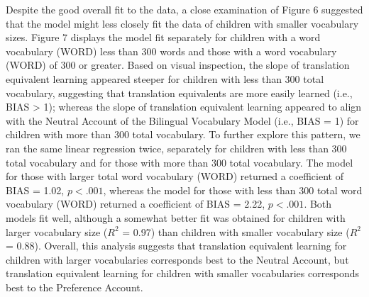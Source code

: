 \documentclass[
  english,
  ,man,floatsintext]{apa6}
\begin{document}
Despite the good overall fit to the data, a close examination of Figure 6 suggested that the model might less closely fit the data of children with smaller vocabulary sizes. Figure 7 displays the model fit separately for children with a word vocabulary (WORD) less than 300 words and those with a word vocabulary (WORD) of 300 or greater. Based on visual inspection, the slope of translation equivalent learning appeared steeper for children with less than 300 total vocabulary, suggesting that translation equivalents are more easily learned (i.e., BIAS \textgreater{} 1); whereas the slope of translation equivalent learning appeared to align with the Neutral Account of the Bilingual Vocabulary Model (i.e., BIAS = 1) for children with more than 300 total vocabulary. To further explore this pattern, we ran the same linear regression twice, separately for children with less than 300 total vocabulary and for those with more than 300 total vocabulary. The model for those with larger total word vocabulary (WORD) returned a coefficient of BIAS = 1.02, \(p < .001\), whereas the model for those with less than 300 total word vocabulary (WORD) returned a coefficient of BIAS = 2.22, \(p < .001\). Both models fit well, although a somewhat better fit was obtained for children with larger vocabulary size (\(R^2\) = 0.97) than children with smaller vocabulary size (\(R^2\) = 0.88). Overall, this analysis suggests that translation equivalent learning for children with larger vocabularies corresponds best to the Neutral Account, but translation equivalent learning for children with smaller vocabularies corresponds best to the Preference Account.

~
\end{document}
